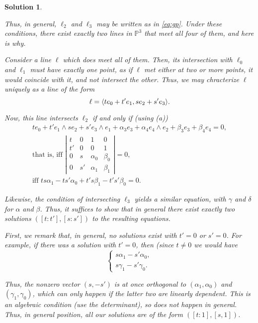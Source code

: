 \documentclass{article}
\theoremstyle{nonumberplain}
\newtheorem{sol}{Solution}
\newcommand{\PP}{\mathbb{P}}
\DeclarePairedDelimiter{\braket}{\langle}{\rangle}
\begin{document}
\begin{sol}
\begin{enumerate}
Thus, in general, $\ell_2$ and $\ell_3$ may be written as in \eqref{eq:gp}. Under these conditions, there exist exactly two lines in $\PP^3$ that meet all four of them, and here is why.

Consider a line $\ell$ which does meet all of them. Then, its intersection with $\ell_0$ and $\ell_1$ must have exactly one point, as if $\ell$ met either at two or more points, it would coincide with it, and not intersect the other. Thus, we may chracterize $\ell$ uniquely as a line of the form
\begin{equation}
\ell = \braket{t e_0 + t' e_1, s e_2 + s' e_3}.
\end{equation}

Now, this line intersects $\ell_2$ if and only if (using (a))
\begin{equation}
\begin{gathered}
t e_0 + t' e_1 \wedge s e_2 + s' e_3 \wedge e_1 + \alpha_3 e_3 + \alpha_4 e_4 \wedge e_2 + \beta_3 e_3 + \beta_4 e_4 = 0,\\
\text{that is, iff }
\left|
\begin{matrix}
t  & 0 & 1 & 0 \\
t' & 0 & 0 & 1 \\
0 & s  & \alpha_0 & \beta_0 \\
0 & s' & \alpha_1 & \beta_1
\end{matrix}
\right| = 0,\\
\text{iff } t s \alpha_1 - t s' \alpha_0 + t' s \beta_1 - t' s' \beta_0 = 0.
\end{gathered}
\end{equation}

Likewise, the condition of intersecting $\ell_3$ yields a similar equation, with $\gamma$ and $\delta$ for $\alpha$ and $\beta$. Thus, it suffices to show that in general there exist exactly two solutions $([t:t'],[s:s'])$ to the resulting equations.

First, we remark that, in general, no solutions exist with $t' = 0$ or $s' = 0$. For example, if there was a solution with $t' = 0$, then (since $t \neq 0$ we would have
\begin{equation}
\begin{cases}
s \alpha_1 - s' \alpha_0,\\
s \gamma_1 - s' \gamma_0.
\end{cases}
\end{equation}

Thus, the nonzero vector $(s,-s')$ is at once orthogonal to $(\alpha_1, \alpha_0)$ and $(\gamma_1,\gamma_0)$, which can only happen if the latter two are linearly dependent. This is an algebraic condition (use the determinant), so does not happen in general. Thus, in general position, all our solutions are of the form $([t:1],[s,1])$.


\end{enumerate}
\end{sol}
\end{document}

